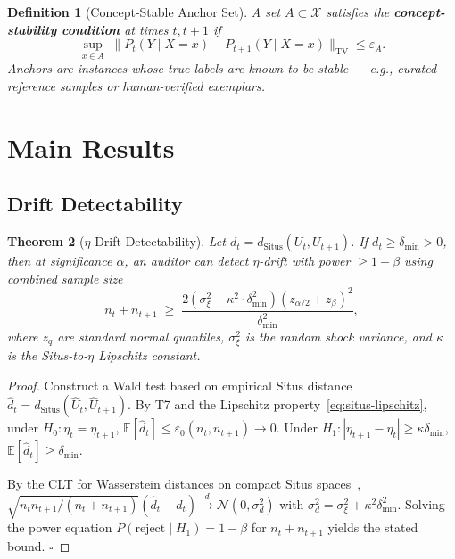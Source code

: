 \documentclass[12pt,a4paper]{article}
\newtheorem{theorem}{Theorem}[section]
\newtheorem{definition}[theorem]{Definition}
\newcommand{\E}{\mathbb{E}}
\newcommand{\cX}{\mathcal{X}}
\newcommand{\Situs}{\mathrm{Situs}}
\begin{document}
\begin{definition}[Concept-Stable Anchor Set]
\label{def:anchor}
A set $A \subset \cX$ satisfies the \textbf{concept-stability condition} at
times $t, t+1$ if
\begin{equation}\label{eq:anchor-condition}
    \sup_{x \in A}\;
    \|P_t(Y \mid X=x) - P_{t+1}(Y \mid X=x)\|_{\mathrm{TV}}
    \leq \varepsilon_A.
\end{equation}
Anchors are instances whose true labels are known to be stable — e.g.,
curated reference samples or human-verified exemplars.
\end{definition}

\section{Main Results}

\subsection{Drift Detectability}

\begin{theorem}[$\eta$-Drift Detectability]
\label{thm:drift-detect}
Let $d_t = d_{\Situs}(U_t, U_{t+1})$.  If $d_t \geq \delta_{\min} > 0$,
then at significance $\alpha$, an auditor can detect $\eta$-drift with
power $\geq 1-\beta$ using combined sample size
\begin{equation}\label{eq:drift-sample-size}
    n_t + n_{t+1} \;\geq\;
    \frac{2(\sigma^2_\xi + \kappa^2 \cdot \delta^2_{\min})
          (z_{\alpha/2} + z_\beta)^2}
         {\delta^2_{\min}},
\end{equation}
where $z_q$ are standard normal quantiles, $\sigma^2_\xi$ is the random
shock variance, and $\kappa$ is the Situs-to-$\eta$ Lipschitz constant.
\end{theorem}

\begin{proof}
Construct a Wald test based on empirical Situs distance
$\widehat{d}_t = d_{\Situs}(\widehat{U}_t, \widehat{U}_{t+1})$.  By T7
and the Lipschitz property~\eqref{eq:situs-lipschitz}, under
$H_0: \eta_t = \eta_{t+1}$,
$\E[\widehat{d}_t] \leq \varepsilon_0(n_t, n_{t+1}) \to 0$.  Under
$H_1: |\eta_{t+1} - \eta_t| \geq \kappa \delta_{\min}$,
$\E[\widehat{d}_t] \geq \delta_{\min}$.

By the CLT for Wasserstein distances on compact Situs
spaces~\citep{sommerfeld2018inference},
$\sqrt{n_t n_{t+1}/(n_t + n_{t+1})}(\widehat{d}_t - d_t)
\xrightarrow{d} \mathcal{N}(0, \sigma^2_d)$ with
$\sigma^2_d = \sigma^2_\xi + \kappa^2 \delta^2_{\min}$.  Solving the power
equation $P(\text{reject} \mid H_1) = 1-\beta$ for $n_t + n_{t+1}$ yields
the stated bound.  $\square$
\end{proof}
\end{document}
